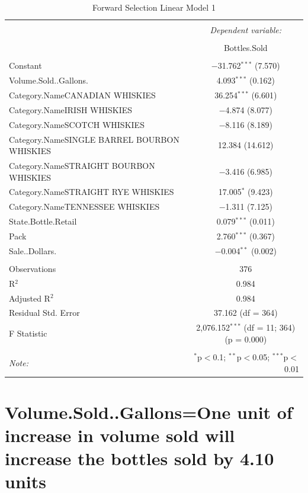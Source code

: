 \documentclass[]{elsarticle} %
\begin{document}
\begin{table}[!htbp] \centering 
  \caption{Forward Selection Linear Model 1} 
  \label{} 
\normalsize 
\begin{tabular}{@{\extracolsep{5pt}}lc} 
\\[-1.8ex]\hline 
\hline \\[-1.8ex] 
 & \multicolumn{1}{c}{\textit{Dependent variable:}} \\ 
\cline{2-2} 
\\[-1.8ex] & Bottles.Sold \\ 
\hline \\[-1.8ex] 
 Constant & $-$31.762$^{***}$ (7.570) \\ 
  Volume.Sold..Gallons. & 4.093$^{***}$ (0.162) \\ 
  Category.NameCANADIAN WHISKIES & 36.254$^{***}$ (6.601) \\ 
  Category.NameIRISH WHISKIES & $-$4.874 (8.077) \\ 
  Category.NameSCOTCH WHISKIES & $-$8.116 (8.189) \\ 
  Category.NameSINGLE BARREL BOURBON WHISKIES & 12.384 (14.612) \\ 
  Category.NameSTRAIGHT BOURBON WHISKIES & $-$3.416 (6.985) \\ 
  Category.NameSTRAIGHT RYE WHISKIES & 17.005$^{*}$ (9.423) \\ 
  Category.NameTENNESSEE WHISKIES & $-$1.311 (7.125) \\ 
  State.Bottle.Retail & 0.079$^{***}$ (0.011) \\ 
  Pack & 2.760$^{***}$ (0.367) \\ 
  Sale..Dollars. & $-$0.004$^{**}$ (0.002) \\ 
 \hline \\[-1.8ex] 
Observations & 376 \\ 
R$^{2}$ & 0.984 \\ 
Adjusted R$^{2}$ & 0.984 \\ 
Residual Std. Error & 37.162 (df = 364) \\ 
F Statistic & 2,076.152$^{***}$ (df = 11; 364)  (p = 0.000) \\ 
\hline 
\hline \\[-1.8ex] 
\textit{Note:}  & \multicolumn{1}{r}{$^{*}$p$<$0.1; $^{**}$p$<$0.05; $^{***}$p$<$0.01} \\ 
\end{tabular} 
\end{table}

\section{Volume.Sold..Gallons=One unit of increase in volume sold will
increase the bottles sold by 4.10
units}\label{volume.sold..gallonsone-unit-of-increase-in-volume-sold-will-increase-the-bottles-sold-by-4.10-units}
\end{document}
